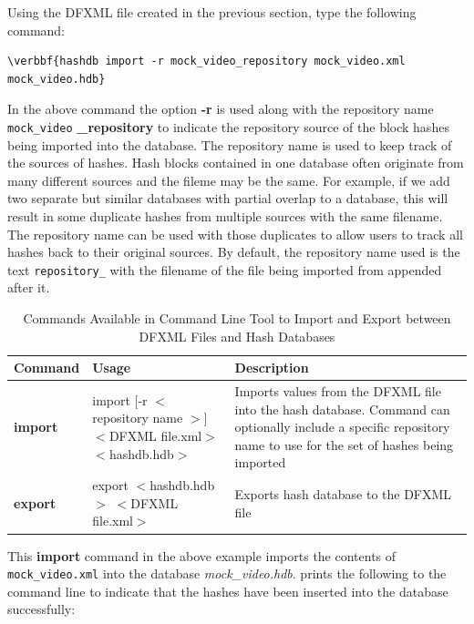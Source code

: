 \documentclass[11pt,fleqn]{article} %
\begin{document}
Using the DFXML file created in the previous section, type the following command:
\begin{Verbatim}[commandchars=\\\{\}]
\verbbf{hashdb import -r mock_video_repository mock_video.xml mock_video.hdb}
\end{Verbatim}
In the above command the option \textbf{-r} is used along with the repository name \texttt{mock\_video} \textbf{\_repository} to indicate the repository source of the block hashes being imported into the database. The repository name is used to keep track of the sources of hashes. Hash blocks contained in one database often originate from many different sources and the fileme may be the same. For example, if we add two separate but similar databases with partial overlap to a database, this will result in some duplicate hashes from multiple sources with the same filename. The repository name can be used with those duplicates to allow users to track all hashes back to their original sources. By default, the repository name used is the text \texttt{repository\_} with the filename of the file being imported from appended after it.\\


\begin{table}[!ht]
\centering
\caption{Commands Available in \hash Command Line Tool to Import and Export between DFXML Files and Hash Databases}
\label{tab:importExport}
\begin{tabular}{|p{2.5 cm}|p{7 cm}|p{4 cm}|}
\hline \hline
\textbf{Command} & \textbf{Usage} & \textbf{Description} \\
\hline
\textbf{import} & import [-r $<$ repository name $>$] $<$DFXML file.xml$>$ $<$hashdb.hdb$>$& Imports values from the DFXML file into the hash database. Command can optionally include a specific repository name to use for the set of hashes being imported\\
\hline
\textbf{export} & export $<$hashdb.hdb$>$ $<$DFXML file.xml$>$ & Exports hash database to the DFXML file\\
\hline
\end{tabular}
\end{table}


This \textbf{import} command in the above example imports the contents of \texttt{mock\_video.xml} into the database \textit{mock\_video.hdb}. \hash prints the following to the command line to indicate that the hashes have been inserted into the database successfully: 
\end{document}
